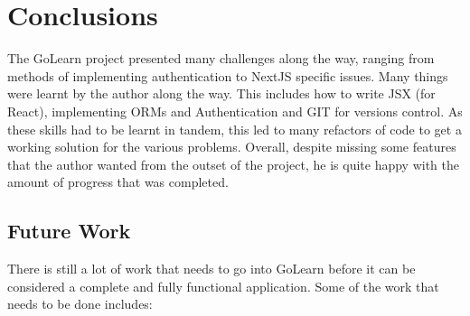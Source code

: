 \documentclass[11pt, a4paper,twoside]{report}
\theoremstyle{plain} %
\theoremstyle{definition} %
\numberwithin{equation}{chapter}
\begin{document}
\chapter{Conclusions}\label{ch:conclusion}

The GoLearn project presented many challenges along the way, ranging from
methods of implementing authentication to NextJS specific issues. Many things
were learnt by the author along the way. This includes how to write JSX (for
React), implementing ORMs and Authentication and GIT for versions control. As
these skills had to be learnt in tandem, this led to many refactors of code to
get a working solution for the various problems. Overall, despite missing some
features that the author wanted from the outset of the project, he is quite
happy with the amount of progress that was completed.

\section{Future Work}

There is still a lot of work that needs to go into GoLearn before it can be
considered a complete and fully functional application. Some of the work that
needs to be done includes:
\end{document}
